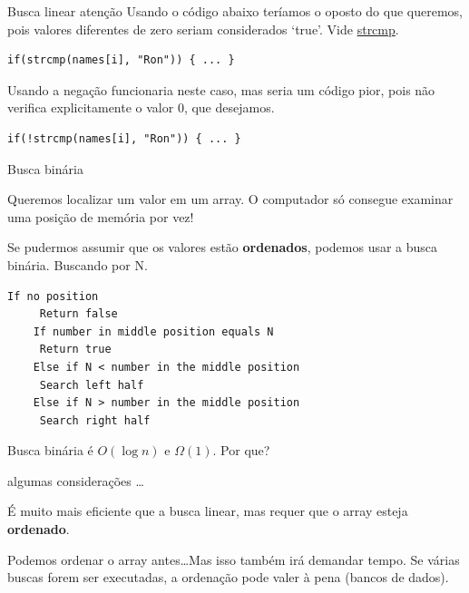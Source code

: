 \documentclass{beamer}
\begin{document}
\begin{frame}{Busca linear}
  {\color{red} atenção} Usando o código abaixo teríamos o oposto do
  que queremos, pois valores diferentes de zero seriam considerados
  `true'. Vide \href{https://man7.org/linux/man-pages/man3/strcmp.3.html}{strcmp}.

  \begin{lstlisting}[style=normalc]
    if(strcmp(names[i], "Ron")) { ... }
  \end{lstlisting}

  Usando a negação funcionaria neste caso, mas seria um código pior,
  pois não verifica explicitamente o valor 0, que desejamos.

  \begin{lstlisting}[style=normalc]
    if(!strcmp(names[i], "Ron")) { ... }
  \end{lstlisting}

\end{frame}


\begin{frame}{Busca binária}

  Queremos localizar um valor em um array. O computador só consegue
  examinar uma posição de memória por vez!

  Se pudermos assumir que os valores estão \textbf{ordenados}, podemos
  usar a busca binária. Buscando por N.

  \begin{lstlisting}[basicstyle=\ttfamily\scriptsize]
    If no position
     Return false
    If number in middle position equals N
     Return true
    Else if N < number in the middle position
     Search left half
    Else if N > number in the middle position
     Search right half
  \end{lstlisting}

  Busca binária é $O(\log n)$ e $\Omega(1)$. Por que? 

  \framebreak

  algumas considerações \ldots

  É muito mais eficiente que a busca linear, mas requer que o array
  esteja \textbf{ordenado}.

  Podemos ordenar o array antes\ldots Mas isso também irá demandar
  tempo. Se várias buscas forem ser executadas, a ordenação pode valer
  à pena (bancos de dados).

\end{frame}  
\end{document}
